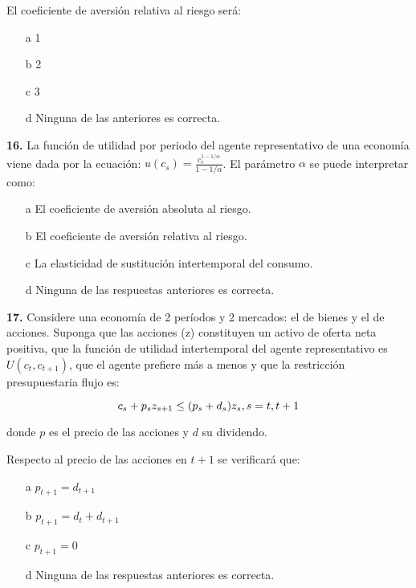 \documentclass{nuevotema}
\begin{document}
El coeficiente de aversión relativa al riesgo será:

\begin{enumerate}
	\item[a] 1
	\item[b] 2
	\item[c] 3
	\item[d] Ninguna de las anteriores es correcta.
\end{enumerate}


\textbf{16.} La función de utilidad por periodo del agente representativo de una economía viene dada por la ecuación: $u(c_s) = \frac{c_s^{1-1/\alpha}}{1-1/\alpha}$. El parámetro $\alpha$ se puede interpretar como:

\begin{enumerate}
    \item[a] El coeficiente de aversión absoluta al riesgo.
    \item[b] El coeficiente de aversión relativa al riesgo.
    \item[c] La elasticidad de sustitución intertemporal del consumo.
    \item[d] Ninguna de las respuestas anteriores es correcta.
\end{enumerate}

\textbf{17.} Considere una economía de 2 períodos y 2 mercados: el de bienes y el de acciones. Suponga que las acciones (z) constituyen un activo de oferta neta positiva, que la función de utilidad intertemporal del agente representativo es $U(c_t, c_{t+1})$, que el agente prefiere más a menos y que la restricción presupuestaria flujo es:

\begin{equation*}
    c_s + p_s z_{s+1} \leq (p_s + d_s) z_s, \\
    s = t, t+1
\end{equation*}

donde $p$ es el precio de las acciones y $d$ su dividendo.

Respecto al precio de las acciones en $t+1$ se verificará que:

\begin{enumerate}
    \item[a] $p_{t+1} = d_{t+1}$
    \item[b] $p_{t+1} = d_t + d_{t+1}$
    \item[c] $p_{t+1} = 0$
    \item[d] Ninguna de las respuestas anteriores es correcta.
\end{enumerate}
\end{document}
